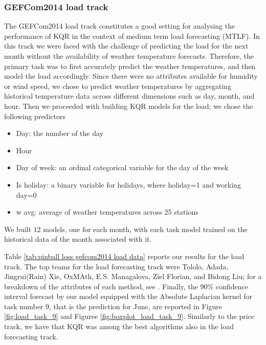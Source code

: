 \subsubsection{GEFCom2014 load track} 
The GEFCom2014 load track constitutes a good setting for analysing the performance of KQR in the context of medium term load forecasting (MTLF).
In this track we were faced with the challenge of predicting the load for the next month without the availability of weather temperature forecasts. 
Therefore, the primary task was to first accurately predict the weather temperatures, and then model the load accordingly. Since there were no attributes available for humidity or wind speed, we chose to predict weather temperatures by aggregating historical temperature data across different dimensions such as day, month, and hour. Then we proceeded with building KQR models for the load; we chose the following predictors
\begin{itemize}
    \item Day: the number of the day
    \item Hour
    \item Day of week: an ordinal categorical variable for the day of the week
    \item Is holiday: a binary variable for holidays, where holiday=1 and working day=0
    \item w avg: average of weather temperatures across 25 stations
\end{itemize}
We built $12$ models, one for each month, with each task model trained on the historical data of the month associated with it.

Table \ref{tab:pinball loss gefcom2014 load data} reports our results for the load track. The top teams for the load forecasting track were Tololo, Adada, Jingrui(Rain) Xie, OxMAth, E.S. Managalova, Ziel Florian, and Bidong Liu; for a breakdown of the attributes of each method, see \cite[Table 6]{hong2016probabilistic}.
Finally, the $90\%$ confidence interval forecast by our model equipped with the Absolute Laplacian kernel for task number $9$, that is the prediction for June, are reported in Figure \ref{fig:load_task_9} and Figuree \ref{fig:boxplot_load_task_9}.
Similarly to the price track, we have that KQR was among the best algorithms also in the load forecasting track.

